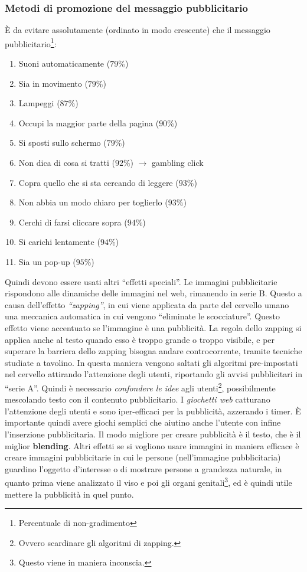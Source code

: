 \subsubsection{Metodi di promozione del messaggio pubblicitario}\`E da evitare assolutamente (ordinato in modo crescente) che il messaggio pubblicitario\footnote{Percentuale di non-gradimento}:
\begin{enumerate}

\item Suoni automaticamente ($79\%$)
\item Sia in movimento ($79\%$)
\item Lampeggi ($87\%$)
\item Occupi la maggior parte della pagina ($90\%$)
\item Si sposti sullo schermo ($79\%$)
\item Non dica di cosa si tratti ($92\%$) $\to$ gambling click
\item Copra quello che si sta cercando di leggere ($93\%$)
\item Non abbia un modo chiaro per toglierlo ($93\%$)
\item Cerchi di farsi cliccare sopra ($94\%$)
\item Si carichi lentamente ($94\%$)
\item Sia un pop-up ($95\%$)

\end{enumerate}
Quindi devono essere usati altri ``effetti speciali''.
Le immagini pubblicitarie rispondono alle dinamiche delle immagini nel web, rimanendo in serie B. Questo a causa dell'effetto \textit{``zapping''}, in cui viene applicata da parte del cervello umano una meccanica automatica in cui vengono ``eliminate le scocciature''. Questo effetto viene accentuato se l'immagine \`e una pubblicit\`a.
La regola dello zapping si applica anche al testo quando esso \`e troppo grande o troppo visibile, e per superare la barriera dello zapping bisogna andare controcorrente, tramite tecniche studiate a tavolino. In questa maniera vengono saltati gli algoritmi pre-impostati nel cervello attirando l'attenzione degli utenti, riportando gli avvisi pubblicitari in ``serie A''. Quindi \`e necessario \textit{confondere le idee} agli utenti\footnote{Ovvero scardinare gli algoritmi di zapping.}, possibilmente mescolando testo con il contenuto pubblicitario.
I \textit{giochetti web} catturano l'attenzione degli utenti e sono iper-efficaci per la pubblicit\`a, azzerando i timer. \`E importante quindi avere giochi semplici che aiutino anche l'utente con infine l'inserzione pubblicitaria.
Il modo migliore per creare pubblicit\`a \`e il testo, che \`e il miglior \textbf{blending}. Altri effetti se si vogliono usare immagini in maniera efficace \`e creare immagini pubblicitarie in cui le persone (nell'immagine pubblicitaria) guardino l'oggetto d'interesse o di mostrare persone a grandezza naturale, in quanto prima viene analizzato il viso e poi gli organi genitali\footnote{Questo viene in maniera inconscia.}, ed \`e quindi utile mettere la pubblicit\`a in quel punto.

